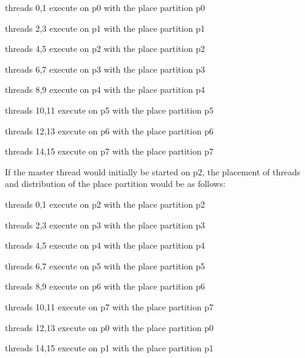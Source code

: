 \begin{compactitem}
\item threads 0,1 execute on p0 with the place partition p0

\item threads 2,3 execute on p1 with the place partition p1

\item threads 4,5 execute on p2 with the place partition p2

\item threads 6,7 execute on p3 with the place partition p3

\item threads 8,9 execute on p4 with the place partition p4

\item threads 10,11 execute on p5 with the place partition p5

\item threads 12,13 execute on p6 with the place partition p6

\item threads 14,15 execute on p7 with the place partition p7
\end{compactitem}

If the master thread would initially be started on p2, the placement of threads 
and distribution of the place partition would be as follows:

\begin{compactitem}
\item threads 0,1 execute on p2 with the place partition p2

\item threads 2,3 execute on p3 with the place partition p3

\item threads 4,5 execute on p4 with the place partition p4

\item threads 6,7 execute on p5 with the place partition p5

\item threads 8,9 execute on p6 with the place partition p6

\item threads 10,11 execute on p7 with the place partition p7

\item threads 12,13 execute on p0 with the place partition p0

\item threads 14,15 execute on p1 with the place partition p1
\end{compactitem}

